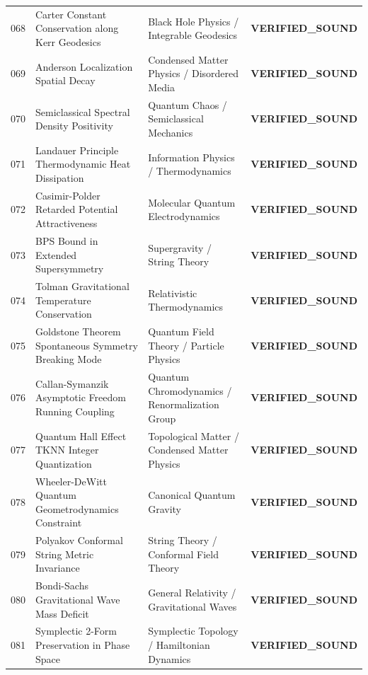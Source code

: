 \documentclass[10pt,a4paper]{article}
\begin{document}
\begin{longtable}{p{0.8cm} p{7.0cm} p{3.8cm} p{3.0cm}}
068 & Carter Constant Conservation along Kerr Geodesics & Black Hole Physics / Integrable Geodesics & \textcolor{green!70!black}{\textbf{VERIFIED\_SOUND}} \\
069 & Anderson Localization Spatial Decay & Condensed Matter Physics / Disordered Media & \textcolor{green!70!black}{\textbf{VERIFIED\_SOUND}} \\
070 & Semiclassical Spectral Density Positivity & Quantum Chaos / Semiclassical Mechanics & \textcolor{green!70!black}{\textbf{VERIFIED\_SOUND}} \\
071 & Landauer Principle Thermodynamic Heat Dissipation & Information Physics / Thermodynamics & \textcolor{green!70!black}{\textbf{VERIFIED\_SOUND}} \\
072 & Casimir-Polder Retarded Potential Attractiveness & Molecular Quantum Electrodynamics & \textcolor{green!70!black}{\textbf{VERIFIED\_SOUND}} \\
073 & BPS Bound in Extended Supersymmetry & Supergravity / String Theory & \textcolor{green!70!black}{\textbf{VERIFIED\_SOUND}} \\
074 & Tolman Gravitational Temperature Conservation & Relativistic Thermodynamics & \textcolor{green!70!black}{\textbf{VERIFIED\_SOUND}} \\
075 & Goldstone Theorem Spontaneous Symmetry Breaking Mode & Quantum Field Theory / Particle Physics & \textcolor{green!70!black}{\textbf{VERIFIED\_SOUND}} \\
076 & Callan-Symanzik Asymptotic Freedom Running Coupling & Quantum Chromodynamics / Renormalization Group & \textcolor{green!70!black}{\textbf{VERIFIED\_SOUND}} \\
077 & Quantum Hall Effect TKNN Integer Quantization & Topological Matter / Condensed Matter Physics & \textcolor{green!70!black}{\textbf{VERIFIED\_SOUND}} \\
078 & Wheeler-DeWitt Quantum Geometrodynamics Constraint & Canonical Quantum Gravity & \textcolor{green!70!black}{\textbf{VERIFIED\_SOUND}} \\
079 & Polyakov Conformal String Metric Invariance & String Theory / Conformal Field Theory & \textcolor{green!70!black}{\textbf{VERIFIED\_SOUND}} \\
080 & Bondi-Sachs Gravitational Wave Mass Deficit & General Relativity / Gravitational Waves & \textcolor{green!70!black}{\textbf{VERIFIED\_SOUND}} \\
081 & Symplectic 2-Form Preservation in Phase Space & Symplectic Topology / Hamiltonian Dynamics & \textcolor{green!70!black}{\textbf{VERIFIED\_SOUND}} \\

\end{longtable}
\end{document}
